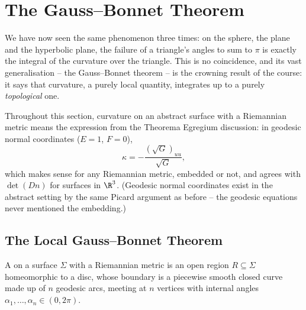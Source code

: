 \section{The Gauss--Bonnet Theorem}

We have now seen the same phenomenon three times: on the sphere, the plane and the hyperbolic plane, the failure of a triangle's angles to sum to $\pi$ is exactly the integral of the curvature over the triangle. This is no coincidence, and its vast generalisation -- the Gauss--Bonnet theorem -- is the crowning result of the course: it says that curvature, a purely local quantity, integrates up to a purely \emph{topological} one.

Throughout this section, curvature on an abstract surface with a Riemannian metric means the expression from the Theorema Egregium discussion: in geodesic normal coordinates ($E = 1$, $F = 0$),
$$
\kappa = -\frac{(\sqrt{G})_{uu}}{\sqrt{G}},
$$
which makes sense for any Riemannian metric, embedded or not, and agrees with $\det(Dn)$ for surfaces in $\R^3$. (Geodesic normal coordinates exist in the abstract setting by the same Picard argument as before -- the geodesic equations never mentioned the embedding.)

\subsection{The Local Gauss--Bonnet Theorem}

\begin{definition}
    A  on a surface $\Sigma$ with a Riemannian metric is an open region $R \subseteq \Sigma$ homeomorphic to a disc, whose boundary is a piecewise smooth closed curve made up of $n$ geodesic arcs, meeting at $n$ vertices with internal angles $\alpha_1, \dots, \alpha_n \in (0, 2\pi)$.
\end{definition}
\begin{center}
\end{center}

